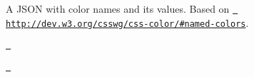 A JSON with color names and its values. Based on \href{http://dev.w3.org/csswg/css-color/\#named-colors}{\texttt{ http\+://dev.\+w3.\+org/csswg/css-\/color/\#named-\/colors}}.

\href{https://nodei.co/npm/color-name/}{\texttt{ }}


\begin{DoxyCode}{0}

\end{DoxyCode}


\href{LICENSE}{\texttt{ }} 